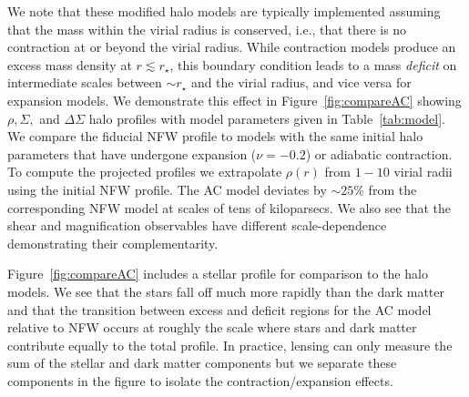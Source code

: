 \documentclass[12pt]{emulateapj}
\begin{document}
We note that these modified halo models are typically implemented
assuming that the mass within the virial radius is conserved, i.e.,
that there is no contraction at or beyond the virial radius. While
contraction models produce an excess mass density at $r \lesssim
r_{\star}$, this boundary condition leads to a mass \textit{deficit} on
intermediate scales between $\sim r_{\star}$ and the virial radius, and vice
versa for expansion models. We demonstrate this effect in
Figure~\ref{fig:compareAC} showing $\rho, \Sigma,$ and $\Delta\Sigma$
halo profiles with model parameters given in Table~\ref{tab:model}. We
compare the fiducial NFW profile to models with the same initial halo
parameters that have undergone expansion ($\nu=-0.2$) or adiabatic
contraction. To compute the projected profiles we extrapolate
$\rho(r)$ from $1-10$ virial radii using the initial NFW profile. The AC model deviates
by $\sim25\%$ from the corresponding NFW model at scales of tens of
kiloparsecs. We also see that the shear and magnification observables have
different scale-dependence demonstrating their complementarity.

\begin{figure*}[htb]
\caption{Density ($\rho(r)$; left), magnification ($\Sigma(R)$;
  center), and shear ($\Delta\Sigma(R)$; right) profiles for different halo models showing the
  effects of baryonic contraction or expansion relative to NFW. A
  Hernquist profile for the stellar component is included for
  comparison. Stellar and NFW model parameters are from Table~\ref{tab:model}. The AC model uses
  $\nu=1$ while the Expansion model has $\nu=-0.2$. The boundary
  condition specifying no contraction at the virial radius leads to a
  deficit (excess) in the AC (Expansion) profiles relative to NFW at
  $r_{\star}\lesssim r\lesssim r_{\rm vir}$.}
\label{fig:compareAC}
\end{figure*}

Figure~\ref{fig:compareAC} includes a stellar profile for comparison
to the halo models. We see that the stars fall off much more rapidly
than the dark matter and that the transition between excess and
deficit regions for the AC model relative to NFW occurs at roughly the scale
where stars and dark matter contribute equally to the total
profile. In practice, lensing can only measure the sum of the stellar
and dark matter components but we separate these components in the
figure to isolate the contraction/expansion effects. 
\end{document}

